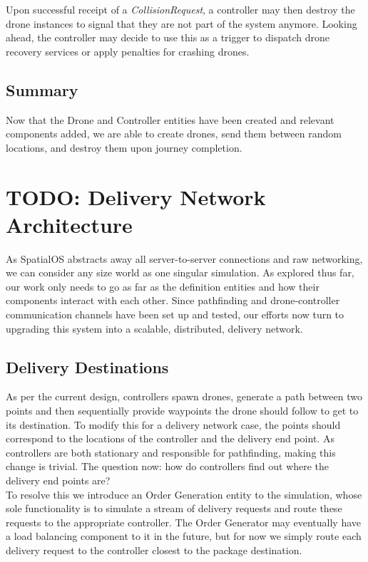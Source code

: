 \documentclass[a4paper,12pt,titlepage]{article}
\begin{document}
Upon successful receipt of a \textit{CollisionRequest}, a controller may then destroy the drone instances to signal that they are not part of the system anymore. Looking ahead, the controller may decide to use this as a trigger to dispatch drone recovery services or apply penalties for crashing drones.

\subsection{Summary}
Now that the Drone and Controller entities have been created and relevant components added, we are able to create drones, send them between random locations, and destroy them upon journey completion.


\newpage
\section{TODO: Delivery Network Architecture}
As SpatialOS abstracts away all server-to-server connections and raw networking, we can consider any size world as one singular simulation. As explored thus far, our work only needs to go as far as the definition entities and how their components interact with each other. Since pathfinding and drone-controller communication channels have been set up and tested, our efforts now turn to upgrading this system into a scalable, distributed, delivery network.

\subsection{Delivery Destinations}
As per the current design, controllers spawn drones, generate a path between two points and then sequentially provide waypoints the drone should follow to get to its destination. To modify this for a delivery network case, the points should correspond to the locations of the controller and the delivery end point. As controllers are both stationary and responsible for pathfinding, making this change is trivial. The question now: how do controllers find out where the delivery end points are?\\

To resolve this we introduce an Order Generation entity to the simulation, whose sole functionality is to simulate a stream of delivery requests and route these requests to the appropriate controller. The Order Generator may eventually have a load balancing component to it in the future, but for now we simply route each delivery request to the controller closest to the package destination.\\
\end{document}
